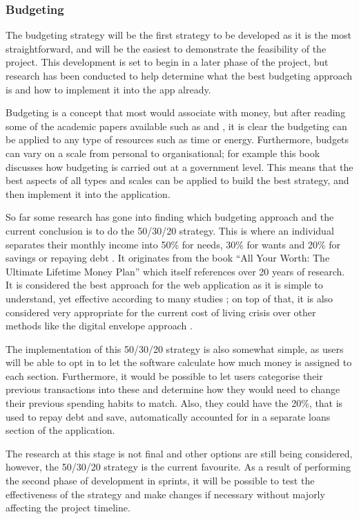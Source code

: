 \subsubsection{Budgeting}
The budgeting strategy will be the first strategy to be developed as it is the most straightforward, and will be the easiest to demonstrate the feasibility of the project. This development is set to begin in a later phase of the project, but research has been conducted to help determine what the best budgeting approach is and how to implement it into the app already.

Budgeting is a concept that most would associate with money, but after reading some of the academic papers available such as \cite{hansen2003practice} and \cite{shim2011budgeting}, it is clear the budgeting can be applied to any type of resources such as time or energy. Furthermore, budgets can vary on a scale from personal to organisational; for example this book \cite{wildavsky1986budgeting} discusses how budgeting is carried out at a government level. This means that the best aspects of all types and scales can be applied to build the best strategy, and then implement it into the application.

So far some research has gone into finding which budgeting approach and the current conclusion is to do the 50/30/20 strategy. This is where an individual separates their monthly income into 50\% for needs, 30\% for wants and 20\% for savings or repaying debt \cite{503020Strategy}. It originates from the book ``All Your Worth: The Ultimate Lifetime Money Plan'' \cite{warren2005all} which itself references over 20 years of research. It is considered the best approach for the web application as it is simple to understand, yet effective according to many studies \cite{503020Examples}; on top of that, it is also considered very appropriate for the current cost of living crisis over other methods like the digital envelope approach \cite{503020InCostLivingCrisis}.

The implementation of this 50/30/20 strategy is also somewhat simple, as users will be able to opt in to let the software calculate how much money is assigned to each section. Furthermore, it would be possible to let users categorise their previous transactions into these and determine how they would need to change their previous spending habits to match. Also, they could have the 20\%, that is used to repay debt and save, automatically accounted for in a separate loans section of the application.

The research at this stage is not final and other options are still being considered, however, the 50/30/20 strategy is the current favourite. As a result of performing the second phase of development in sprints, it will be possible to test the effectiveness of the strategy and make changes if necessary without majorly affecting the project timeline.

